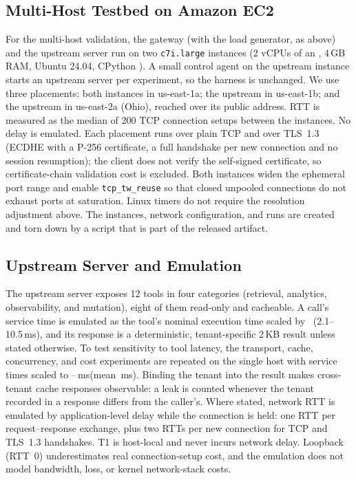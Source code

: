 \documentclass{ieeeaccess}
\newcommand{\ms}{\,ms\xspace}
\begin{document}
\subsection{Multi-Host Testbed on Amazon EC2}
\label{sec:method-aws}
For the multi-host validation, the gateway (with the load generator, as above) and the upstream server run on two \texttt{c7i.large} instances (2 vCPUs of an \awCpuName, 4\,GB RAM, Ubuntu 24.04, CPython \awPython). A small control agent on the upstream instance starts an upstream server per experiment, so the harness is unchanged. We use three placements: both instances in us-east-1a; the upstream in us-east-1b; and the upstream in us-east-2a (Ohio), reached over its public address. RTT is measured as the median of 200 TCP connection setups between the instances. No delay is emulated. Each placement runs over plain TCP and over TLS~1.3 (ECDHE with a P-256 certificate, a full handshake per new connection and no session resumption); the client does not verify the self-signed certificate, so certificate-chain validation cost is excluded. Both instances widen the ephemeral port range and enable \texttt{tcp\_tw\_reuse} so that closed unpooled connections do not exhaust ports at saturation. Linux timers do not require the resolution adjustment above. The instances, network configuration, and runs are created and torn down by a script that is part of the released artifact.

\subsection{Upstream Server and Emulation}
The upstream server exposes 12 tools in four categories (retrieval, analytics, observability, and mutation), eight of them read-only and cacheable. A call's service time is emulated as the tool's nominal execution time scaled by \tbIoScale\ (2.1--10.5\ms), and its response is a deterministic, tenant-specific 2\,KB result unless stated otherwise. To test sensitivity to tool latency, the transport, cache, concurrency, and cost experiments are repeated on the single host with service times scaled to \hToolMin--\hToolMax\ms (mean \hToolMean\ms). Binding the tenant into the result makes cross-tenant cache responses observable: a leak is counted whenever the tenant recorded in a response differs from the caller's. Where stated, network RTT is emulated by application-level delay while the connection is held: one RTT per request--response exchange, plus two RTTs per new connection for TCP and TLS~1.3 handshakes. T1 is host-local and never incurs network delay. Loopback (RTT~0) underestimates real connection-setup cost, and the emulation does not model bandwidth, loss, or kernel network-stack costs.
\end{document}
